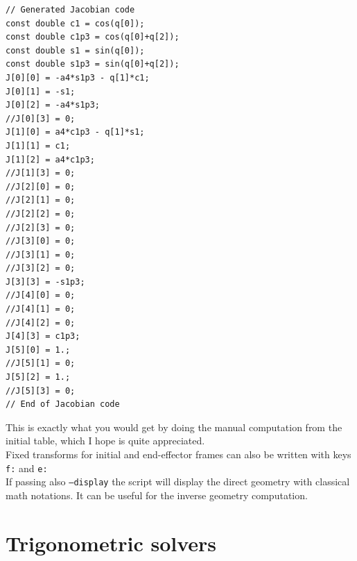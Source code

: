 \documentclass{ecnreport}
\begin{document}
\begin{minipage}{.1\linewidth}
	\quad\quad
\end{minipage}
\begin{minipage}{.45\linewidth}
\cppstyle \raggedright
\begin{lstlisting}
// Generated Jacobian code
const double c1 = cos(q[0]);
const double c1p3 = cos(q[0]+q[2]);
const double s1 = sin(q[0]);
const double s1p3 = sin(q[0]+q[2]);
J[0][0] = -a4*s1p3 - q[1]*c1;
J[0][1] = -s1;
J[0][2] = -a4*s1p3;
//J[0][3] = 0;
J[1][0] = a4*c1p3 - q[1]*s1;
J[1][1] = c1;
J[1][2] = a4*c1p3;
//J[1][3] = 0;
//J[2][0] = 0;
//J[2][1] = 0;
//J[2][2] = 0;
//J[2][3] = 0;
//J[3][0] = 0;
//J[3][1] = 0;
//J[3][2] = 0;
J[3][3] = -s1p3;
//J[4][0] = 0;
//J[4][1] = 0;
//J[4][2] = 0;
J[4][3] = c1p3;
J[5][0] = 1.;
//J[5][1] = 0;
J[5][2] = 1.;
//J[5][3] = 0;
// End of Jacobian code
\end{lstlisting}	
\end{minipage}
This is exactly what you would get by doing the manual computation from the initial table, which I hope is quite appreciated.\\

Fixed transforms for initial and end-effector frames can also be written with keys \texttt{f:} and \texttt{e:}\\

If passing also \texttt{--display} the script will display the direct geometry with classical math notations. It can be useful for the inverse geometry computation.

\newpage
\section{Trigonometric solvers}\label{trigsolve}
\end{document}
